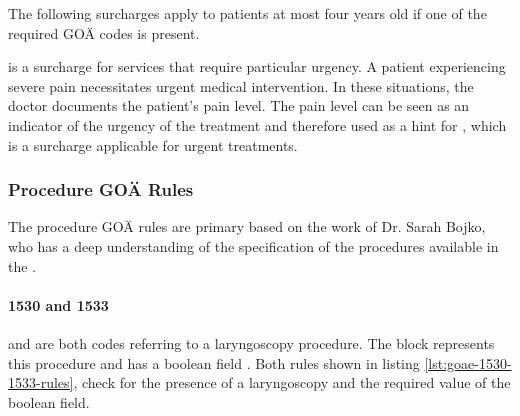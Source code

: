 

The following surcharges apply to patients at most four years old if one of the required GOÄ codes is present.



 is a surcharge for services that require particular urgency.
A patient experiencing severe pain necessitates urgent medical intervention.
In these situations, the doctor documents the patient's pain level.
The pain level can be seen as an indicator of the urgency of the treatment and therefore used as a hint for , which is a surcharge applicable for urgent treatments.




\subsubsection{Procedure GOÄ Rules}
The procedure GOÄ rules are primary based on the work of Dr. Sarah Bojko, who has a deep understanding of the specification of the procedures available in the \AVS.
\paragraph{1530 and 1533}
 and  are both codes referring to a laryngoscopy procedure.
The  block represents this procedure and has a boolean field .
Both rules shown in listing \ref{lst:goae-1530-1533-rules}, check for the presence of a laryngoscopy and the required value of the  boolean field.


